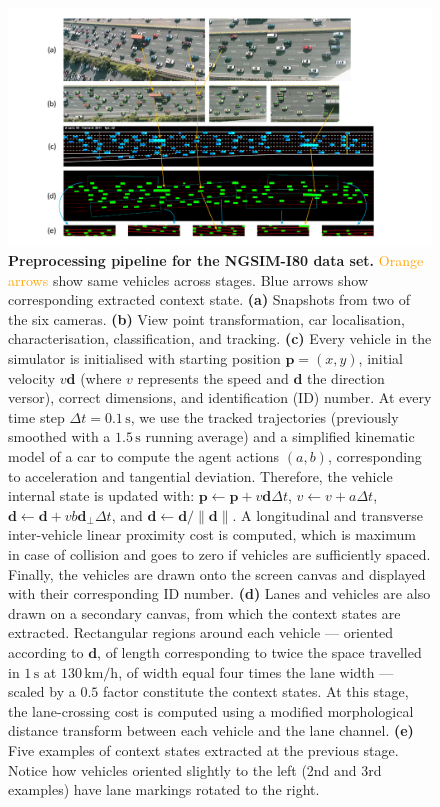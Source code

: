 \documentclass{article}
\begin{document}
\begin{figure}
  \centering
    \includegraphics[width=\textwidth]{images/I-80}
  \caption{
    \textbf{Preprocessing pipeline for the NGSIM-I80 data set.}
    \textcolor{Orange}{Orange arrows} show same vehicles across stages.
    \textcolor{ProcessBlue}{Blue arrows} show corresponding extracted context state.
    \textbf{(a)} Snapshots from two of the six cameras.
    \textbf{(b)} View point transformation, car localisation, characterisation, classification, and tracking.
    \textbf{(c)} Every vehicle in the simulator is initialised with starting position $\bm{p} = (x, y)$, initial velocity $v \bm{d}$ (where $v$ represents the speed and $\bm{d}$ the direction versor), correct dimensions, and identification (ID) number.
    At every time step $\Delta t = 0.1\,\text{s}$, we use the tracked trajectories (previously smoothed with a $1.5\,\text{s}$ running average) and a simplified kinematic model of a car to compute the agent actions $(a, b)$, corresponding to acceleration and tangential deviation.
    Therefore, the vehicle internal state is updated with: $\bm{p} \gets \bm{p} + v \bm{d} \Delta t$, $v \gets v + a \Delta t$, $\bm{d} \gets \bm{d} + v b \bm{d}_\perp \Delta t$, and $\bm{d} \gets \bm{d} / \lVert \bm{d} \rVert$.
    A longitudinal and transverse inter-vehicle linear proximity cost is computed, which is maximum in case of collision and goes to zero if vehicles are sufficiently spaced.
    Finally, the vehicles are drawn onto the screen canvas and displayed with their corresponding ID number.
    \textbf{(d)} Lanes and vehicles are also drawn on a secondary canvas, from which the context states are extracted.
    Rectangular regions around each vehicle --- oriented according to $\bm{d}$, of length corresponding to twice the space travelled in $1\,\text{s}$ at $130\,\text{km/h}$, of width equal four times the lane width --- scaled by a $0.5$ factor constitute the context states.
    At this stage, the lane-crossing cost is computed using a modified morphological distance transform between each vehicle and the lane channel.
    \textbf{(e)} Five examples of context states extracted at the previous stage.
    Notice how vehicles oriented slightly to the left (2nd and 3rd examples) have lane markings rotated to the right.
  }
\end{figure}
\end{document}
